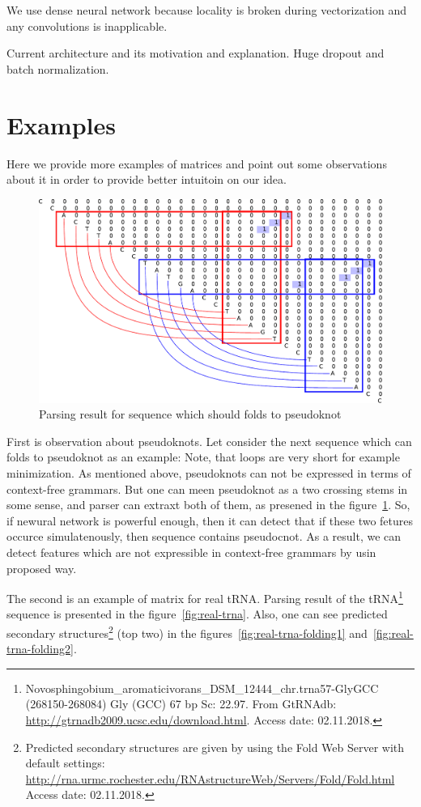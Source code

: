 \documentclass[a4paper,twoside]{article}
\begin{document}
We use dense neural network because locality is broken during vectorization and any convolutions is inapplicable.

Current architecture and its motivation and explanation.
Huge dropout and batch normalization.

\section{Examples}
\label{sec:examples}

\noindent Here we provide more examples of matrices and point out some observations about it in order to provide better intuitoin on our idea.

\begin{figure}
\centering
\includegraphics[width=.5\textwidth]{figures/5.pdf}
\caption{Parsing result for sequence which should folds to pseudoknot}
\label{fig:pseudoknot}
\end{figure}

First is observation about pseudoknots. 
Let consider the next sequence which can folds to pseudoknot as an example: {}
Note, that loops are very short for example minimization.
As mentioned above, pseudoknots can not be expressed in terms of context-free grammars. 
But one can meen pseudoknot as a two crossing stems in some sense, and parser can extraxt both of them, as presened in the figure~\ref{fig:pseudoknot}.
So, if newural network is powerful enough, then it can detect that if these two fetures occurce simulatenously, then sequence contains pseudocnot.
As a result, we can detect features which are not expressible in context-free grammars by usin proposed way.

The second is an example of matrix for real tRNA.
Parsing result of the tRNA\footnote{Novosphingobium\_aromaticivorans\_DSM\_12444\_chr.trna57-GlyGCC (268150-268084)  Gly (GCC) 67 bp Sc: 22.97. From GtRNAdb: \url{http://gtrnadb2009.ucsc.edu/download.html}. Access date: 02.11.2018.} sequence {} is presented in the figure~\ref{fig:real-trna}. Also, one can see predicted secondary structures\footnote{Predicted secondary structures are given by using the Fold Web Server with default settings: \url{http://rna.urmc.rochester.edu/RNAstructureWeb/Servers/Fold/Fold.html} Access date: 02.11.2018.} (top two) in the figures~\ref{fig:real-trna-folding1} and~\ref{fig:real-trna-folding2}.
\end{document}
